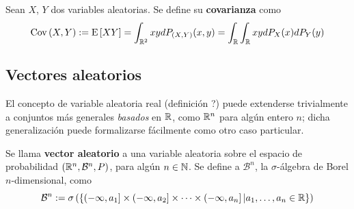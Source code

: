 

\begin{definicion}
Sean $X$, $Y$ dos variables aleatorias. Se define su \textbf{covarianza} como
\begin{equation}
\mathrm{Cov}\left( X,Y \right) := \mathrm{E}\left[ X Y \right] = \int_{\mathbb{R}^{2}} x y d P_{(X,Y)}(x,y) = \int_{\mathbb{R}} \int_{\mathbb{R}} x y dP_X(x) dP_Y(y)
\end{equation}
\end{definicion}



\subsection{Vectores aleatorios}

El concepto de variable aleatoria real (definición ?) puede extenderse trivialmente a conjuntos más generales \textit{basados} en $\mathbb{R}$, como $\mathbb{R}^{n}$ para algún entero $n$; dicha generalización puede formalizarse fácilmente como otro caso particular.

\begin{definicion}
Se llama \textbf{vector aleatorio} a una variable aleatoria sobre el espacio de probabilidad $(\mathbb{R}^{n},\mathcal{B}^{n},P)$, para algún $n\in \mathbb{N}$. Se define a $\mathcal{B}^{n}$, la $\sigma$-álgebra de Borel $n$-dimensional, como
\begin{equation}
\mathcal{B}^{n} := \sigma\left(\left\{ \left(-\infty, a_1\right]\times \left(-\infty, a_2\right]\times \cdots \times \left(-\infty, a_n\right] \lvert a_1, \dots, a_n \in \mathbb{R} \right\}\right)
\end{equation}
\end{definicion}

